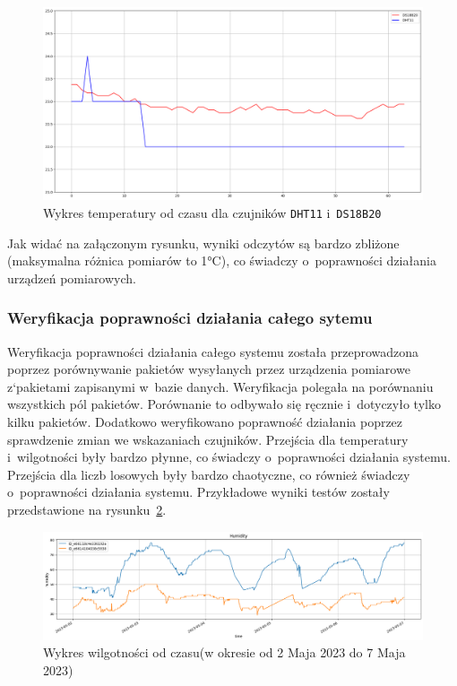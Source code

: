 \begin{figure}[b!]
    \begin{center}
        \includegraphics[width=15cm]{pic/dht-vs-ds.png}
    \end{center}
    \caption{Wykres temperatury od czasu dla czujników \texttt{DHT11} i~\texttt{DS18B20}}\label{rys:dht-vs-ds}
\end{figure}

Jak widać na załączonym rysunku, wyniki odczytów są bardzo zbliżone (maksymalna różnica pomiarów to 1°C), co świadczy o~poprawności działania urządzeń pomiarowych.

\subsubsection{Weryfikacja poprawności działania całego sytemu}
Weryfikacja poprawności działania całego systemu została przeprowadzona poprzez porównywanie pakietów wysyłanych przez urządzenia pomiarowe z`pakietami zapisanymi w~bazie danych.
Weryfikacja polegała na porównaniu wszystkich pól pakietów.
Porównanie to odbywało się ręcznie i~dotyczyło tylko kilku pakietów.
Dodatkowo weryfikowano poprawność działania poprzez sprawdzenie zmian we wskazaniach czujników.
Przejścia dla temperatury i~wilgotności były bardzo płynne, co świadczy o~poprawności działania systemu.
Przejścia dla liczb losowych były bardzo chaotyczne, co również świadczy o~poprawności działania systemu.
Przykładowe wyniki testów zostały przedstawione na rysunku~\ref{rys:porownanie-hum}.

\begin{figure}[b!]
    \begin{center}
        \includegraphics[width=15cm]{pic/diagram-humidity.png}
    \end{center}
    \caption{Wykres wilgotności od czasu(w okresie od 2 Maja 2023 do 7 Maja 2023)}\label{rys:porownanie-hum}
\end{figure}


